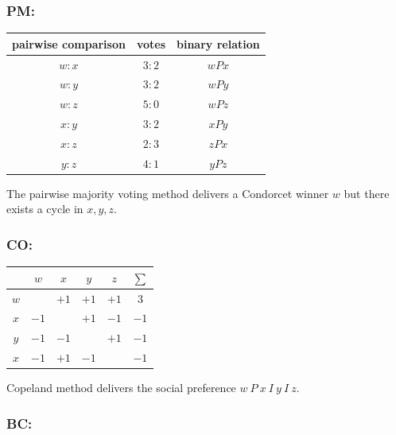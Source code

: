 \documentclass[a4paper]{article}
\begin{document}
\subsubsection*{PM:}


\begin{table}[!htbp]
    \centering
    \begin{tabular}{ccc}
        pairwise comparison & votes  & binary relation \\
        \hline 
        $w:x$  & $3:2$  & $wPx$           \\
        $w:y$  & $3:2$  & $wPy$           \\
        $w:z$  & $5:0$  & $wPz$           \\
        $x:y$  & $3:2$  & $xPy$           \\
        $x:z$  & $2:3$  & $zPx$           \\
        $y:z$  & $4:1$  & $yPz$           \\
        \hline
    \end{tabular}
\end{table}

The pairwise majority voting method delivers a Condorcet winner $w$ but there exists a cycle in $x, y, z$.

\subsubsection*{CO:}

\begin{table}[!htbp]
    \centering
    \begin{tabular}{c|c|c|c|c|c}
            & $w$  & $x$  & $y$  & $z$  & $\sum$ \\
        \hline 
        $w$ &      & $+1$ & $+1$ & $+1$ & $3$    \\
        \hline 
        $x$ & $-1$ &      & $+1$ & $-1$ & $-1$   \\
        \hline
        $y$ & $-1$ & $-1$ &      & $+1$ & $-1$   \\
        \hline
        $x$ & $-1$ & $+1$ & $-1$ &      & $-1$   \\
        \hline
    \end{tabular}
\end{table}

Copeland method delivers the social preference $w \: P \: x \: I \: y \: I \: z$.

\subsubsection*{BC:}
\end{document}
